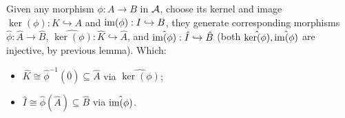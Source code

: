 \documentclass{article}
\begin{document}
\begin{lem}
    Given any morphism $\phi:A\rightarrow B$ in $\cal{A}$, choose its kernel and image $\ker(\phi):K\hookrightarrow A$ and $\mathrm{im}(\phi):I\hookrightarrow B$, they generate corresponding morphisms $\hat{\phi}:\hat{A}\rightarrow\hat{B}$, $\hat{\ker(\phi)}:\hat{K}\hookrightarrow\hat{A}$, and $\hat{\mathrm{im}(\phi)}:\hat{I}\hookrightarrow\hat{B}$ (both $\hat{\ker(\phi)},\hat{\mathrm{im}(\phi)}$ are injective, by previous lemma). Which:
    \begin{itemize}
        \item $\hat{K} \cong \hat{\phi}^{-1}(\overline{0}) \subseteq \hat{A}$ via $\hat{\ker(\phi)}$;
        \item $\hat{I}\cong \hat{\phi}(\hat{A})\subseteq \hat{B}$ via $\hat{\mathrm{im}(\phi)}$.
    \end{itemize}
\end{lem}
\end{document}
